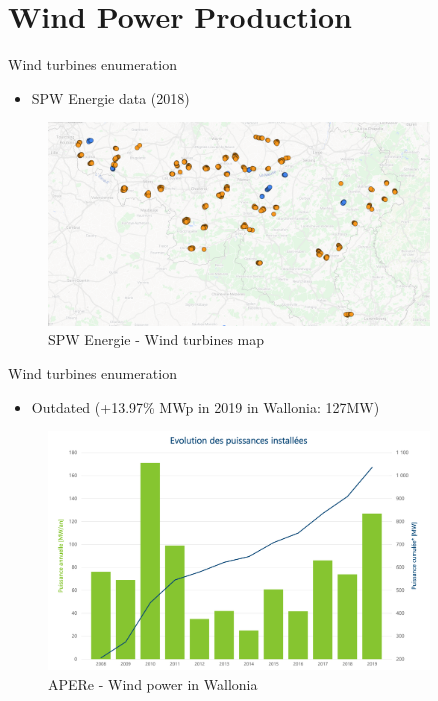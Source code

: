 \documentclass[12pt]{beamer}
\begin{document}
\section{Wind Power Production}

\begin{frame}{Wind turbines enumeration}
    \begin{itemize}
        \item SPW Energie data (2018)
    \end{itemize}
    \begin{figure}
        \centering
        \includegraphics[width=0.9\textwidth]{resources/png/SPW_data.png}
        \caption*{SPW Energie - Wind turbines map \cite{spwe-wind-turbines}}
    \end{figure}
\end{frame}

\begin{frame}{Wind turbines enumeration}
    \begin{itemize}
        \item Outdated (+13.97\% MWp in 2019 in Wallonia: 127MW)
    \end{itemize}
    \begin{figure}
        \centering
        \includegraphics[width=0.9\textwidth]{resources/png/APERe_total_power.png}
        \caption*{APERe - Wind power in Wallonia \cite{elia_wind}}
    \end{figure}
\end{frame}
\end{document}
